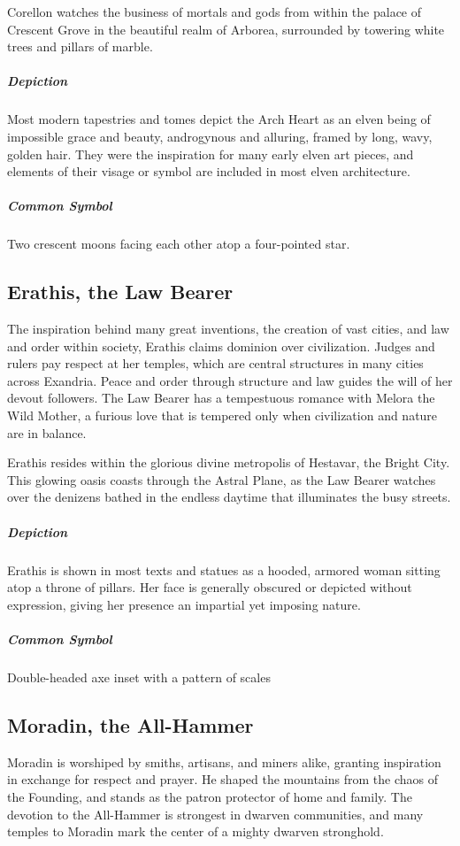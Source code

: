 \documentclass[letterpaper, twocolumn, openany, nodeprecatedcode, layout=true]{dndbook}
\begin{document}
Corellon watches the business of mortals and gods from within the palace of Crescent
Grove in the beautiful realm of Arborea, surrounded by towering white trees and
pillars of marble.

\subparagraph{Depiction}
Most modern tapestries and tomes depict the Arch Heart as an elven being of impossible
grace and beauty, androgynous and alluring, framed by long, wavy, golden hair. They were
the inspiration for many early elven art pieces, and elements of their visage or symbol
are included in most elven architecture.

\subparagraph{Common Symbol}
Two crescent moons facing each other atop a four-pointed star.

\subsection{Erathis, the Law Bearer}

The inspiration behind many great inventions, the creation of vast cities, and law and
order within society, Erathis claims dominion over civilization. Judges and rulers pay
respect at her temples, which are central structures in many cities across Exandria.
Peace and order through structure and law guides the will of her devout followers.
The Law Bearer has a tempestuous romance with Melora the Wild Mother, a furious love
that is tempered only when civilization and nature are in balance.

Erathis resides within the glorious divine metropolis of Hestavar, the Bright City.
This glowing oasis coasts through the Astral Plane, as the Law Bearer watches over the
denizens bathed in the endless daytime that illuminates the busy streets.

\subparagraph{Depiction}
Erathis is shown in most texts and statues as a hooded, armored woman sitting atop a
throne of pillars. Her face is generally obscured or depicted without expression,
giving her presence an impartial yet imposing nature.

\subparagraph{Common Symbol}
Double-headed axe inset with a pattern of scales

\subsection{Moradin, the All-Hammer}

Moradin is worshiped by smiths, artisans, and miners alike, granting inspiration in
exchange for respect and prayer. He shaped the mountains from the chaos of the Founding,
and stands as the patron protector of home and family. The devotion to the All-Hammer is
strongest in dwarven communities, and many temples to Moradin mark the center of a mighty
dwarven stronghold.
\end{document}
